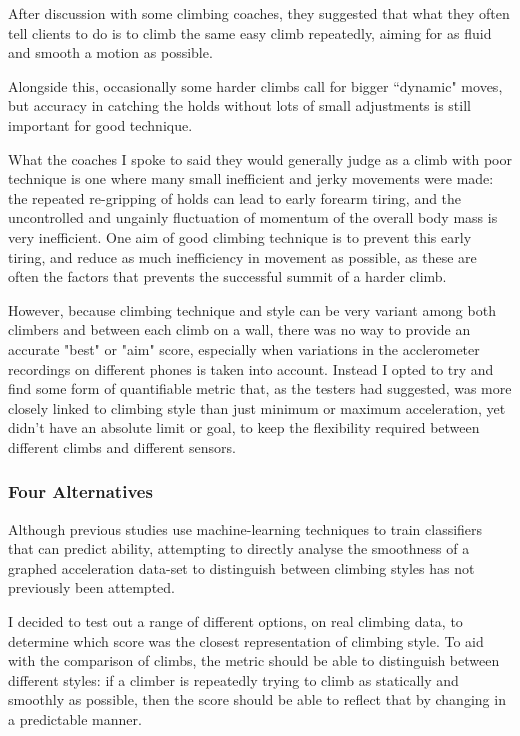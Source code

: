 After discussion with some climbing coaches, they suggested that what they often tell clients to do is to climb the same easy climb repeatedly, aiming for as fluid and smooth a motion as possible.




Alongside this, occasionally some harder climbs call for bigger ``dynamic" moves, but accuracy in catching the holds without lots of small adjustments is still important for good technique.


What the coaches I spoke to said they would generally judge as a climb with poor technique is one where many small inefficient and jerky movements were made: the repeated re-gripping of holds can lead to early forearm tiring, and the uncontrolled and ungainly fluctuation of momentum of the overall body mass is very inefficient.
One aim of good climbing technique is to prevent this early tiring, and reduce as much inefficiency in movement as possible, as these are often the factors that prevents the successful summit of a harder climb.

However, because climbing technique and style can be very variant among both climbers and between each climb on a wall, there was no way to provide an accurate "best" or "aim" score, especially when variations in the acclerometer recordings on different phones is taken into account.
Instead I opted to try and find some form of quantifiable metric that, as the testers had suggested, was more closely linked to climbing style than just minimum or maximum acceleration, yet didn't have an absolute limit or goal, to keep the flexibility required between different climbs and different sensors.

\subsubsection{Four Alternatives}
Although previous studies\cite{climbaxstudy, climbbsn} use machine-learning techniques to train classifiers that can predict ability, attempting to directly analyse the smoothness of a graphed acceleration data-set to distinguish between climbing styles has not previously been attempted.

I decided to test out a range of different options, on real climbing data, to determine which score was the closest representation of climbing style.
To aid with the comparison of climbs, the metric should be able to distinguish between different styles: if a climber is repeatedly trying to climb as statically and smoothly as possible, then the score should be able to reflect that by changing in a predictable manner.

